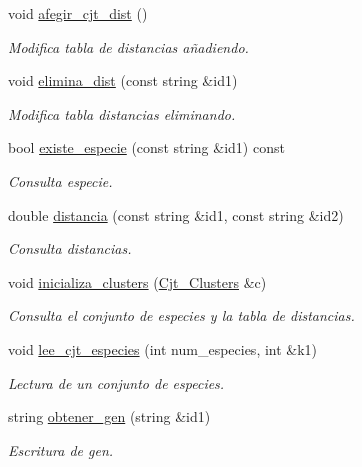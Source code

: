 \begin{DoxyCompactItemize}
void \hyperlink{class_cjt___especies_a32f9d2fb3c0cf9800d6d7492977beea6}{afegir\+\_\+cjt\+\_\+dist} ()
\begin{DoxyCompactList}\small\item\em Modifica tabla de distancias añadiendo. \end{DoxyCompactList}\item 
void \hyperlink{class_cjt___especies_aa5a9db993526200a3bf0a640e4ac49bc}{elimina\+\_\+dist} (const string \&id1)
\begin{DoxyCompactList}\small\item\em Modifica tabla distancias eliminando. \end{DoxyCompactList}\item 
bool \hyperlink{class_cjt___especies_a7500b2ef69fc99e66948ee4e34e60fb2}{existe\+\_\+especie} (const string \&id1) const
\begin{DoxyCompactList}\small\item\em Consulta especie. \end{DoxyCompactList}\item 
double \hyperlink{class_cjt___especies_a14c0282be94e2520cca51539118b5b76}{distancia} (const string \&id1, const string \&id2)
\begin{DoxyCompactList}\small\item\em Consulta distancias. \end{DoxyCompactList}\item 
void \hyperlink{class_cjt___especies_ae599e4e30a1d77e435395b796f821e06}{inicializa\+\_\+clusters} (\hyperlink{class_cjt___clusters}{Cjt\+\_\+\+Clusters} \&c)
\begin{DoxyCompactList}\small\item\em Consulta el conjunto de especies y la tabla de distancias. \end{DoxyCompactList}\item 
void \hyperlink{class_cjt___especies_a3550a8bb7970521eba6efa70afad88b4}{lee\+\_\+cjt\+\_\+especies} (int num\+\_\+especies, int \&k1)
\begin{DoxyCompactList}\small\item\em Lectura de un conjunto de especies. \end{DoxyCompactList}\item 
string \hyperlink{class_cjt___especies_a4cc8f3f5c7f0eadbb19526bbc1ab10bc}{obtener\+\_\+gen} (string \&id1)
\begin{DoxyCompactList}\small\item\em Escritura de gen. \end{DoxyCompactList}\item 

\end{DoxyCompactItemize}
